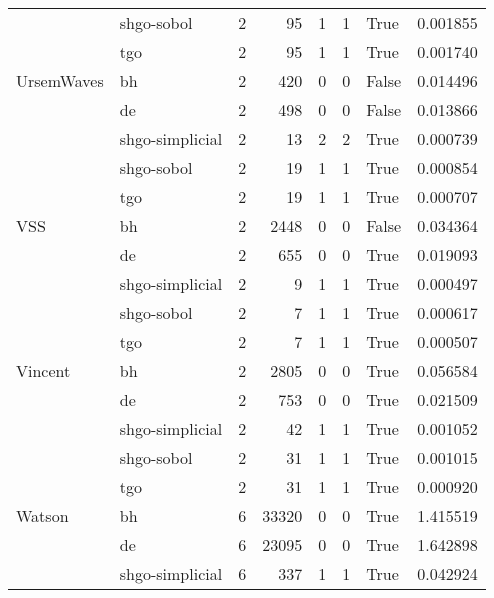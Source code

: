 \begin{longtable}{llrrrrlr}
         & shgo-sobol &     2 &       95 &      1 &       1 &    True &    0.001855 \\
         & tgo &     2 &       95 &      1 &       1 &    True &    0.001740 \\
UrsemWaves & bh &     2 &      420 &      0 &       0 &   False &    0.014496 \\
         & de &     2 &      498 &      0 &       0 &   False &    0.013866 \\
         & shgo-simplicial &     2 &       13 &      2 &       2 &    True &    0.000739 \\
         & shgo-sobol &     2 &       19 &      1 &       1 &    True &    0.000854 \\
         & tgo &     2 &       19 &      1 &       1 &    True &    0.000707 \\
VSS & bh &     2 &     2448 &      0 &       0 &   False &    0.034364 \\
         & de &     2 &      655 &      0 &       0 &    True &    0.019093 \\
         & shgo-simplicial &     2 &        9 &      1 &       1 &    True &    0.000497 \\
         & shgo-sobol &     2 &        7 &      1 &       1 &    True &    0.000617 \\
         & tgo &     2 &        7 &      1 &       1 &    True &    0.000507 \\
Vincent & bh &     2 &     2805 &      0 &       0 &    True &    0.056584 \\
         & de &     2 &      753 &      0 &       0 &    True &    0.021509 \\
         & shgo-simplicial &     2 &       42 &      1 &       1 &    True &    0.001052 \\
         & shgo-sobol &     2 &       31 &      1 &       1 &    True &    0.001015 \\
         & tgo &     2 &       31 &      1 &       1 &    True &    0.000920 \\
Watson & bh &     6 &    33320 &      0 &       0 &    True &    1.415519 \\
         & de &     6 &    23095 &      0 &       0 &    True &    1.642898 \\
         & shgo-simplicial &     6 &      337 &      1 &       1 &    True &    0.042924 \\

\end{longtable}
